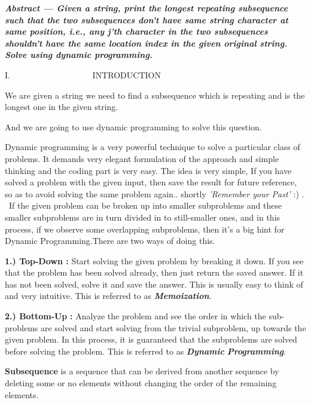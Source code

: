 \documentclass[letterpaper]{article}
\begin{document}
\begin{multicols}{2}
{\bfseries\itshape
Abstract --- Given a string, print the longest repeating subsequence such that the two subsequences don't have same
string character at same position, i.e., any j'th character in the two subsequences shouldn't have the same location
index in the given original string. Solve using dynamic programming.}


\bigskip


\bigskip

I. \ \ \ \ \ \ \ \ \ \ \ \ \ \ \ \ \ \ \ INTRODUCTION


\bigskip

We are given a string we need to find a subsequence which is repeating and is the longest one in the given string.

And we are going to use dynamic programming to solve this question. 

Dynamic programming is a very powerful technique to solve a particular class of problems. It demands very elegant
formulation of the approach and simple thinking and the coding part is very easy. The idea is very simple, If you have
solved a problem with the given input, then save the result for future reference, so as to avoid solving the same
problem again.. shortly \textit{{}'Remember your Past'} :) . \ If the given problem can be broken up into smaller
subproblems and these smaller subproblems are in turn divided in to still-smaller ones, and in this process, if we
observe some overlapping subproblems, then it's a big hint for Dynamic Programming.There are two ways of doing this.

\textbf{1.) Top-Down : }Start solving the given problem by breaking it down. If you see that the problem has been solved
already, then just return the saved answer. If it has not been solved, solve it and save the answer. This is usually
easy to think of and very intuitive. This is referred to as \textbf{\textit{Memoization}}.

\textbf{2.) Bottom-Up} \textbf{:} Analyze the problem and see the order in which the sub-problems are solved and start
solving from the trivial subproblem, up towards the given problem. In this process, it is guaranteed that the
subproblems are solved before solving the problem. This is referred to as \textbf{\textit{Dynamic
}}\textbf{\textit{Programming}}.


\bigskip

\textbf{Subsequence} is a sequence that can be derived from another sequence by deleting some or no elements without
changing the order of the remaining elements. 


\end{multicols}
\end{document}
